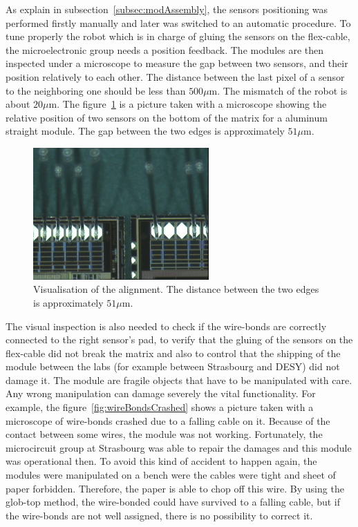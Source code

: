   As explain in subsection~\ref{subsec:modAssembly}, the sensors positioning was performed firstly manually and later was switched to an automatic procedure.
  To tune properly the robot which is in charge of gluing the sensors on the flex-cable, the microelectronic group needs a position feedback.
  The modules are then inspected under a microscope to measure the gap between two sensors, and their position relatively to each other.
  The distance between the last pixel of a sensor to the neighboring one should be less than $500 \mu\text{m}$.
  The mismatch of the robot is about $20\mu\text{m}$. 
  The figure~\ref{fig:visAlign} is a picture taken with a microscope showing the relative position of two sensors on the bottom of the matrix for a aluminum straight module.
  The gap between the two edges is approximately $51 \mu\text{m}$. 
  
  \begin{figure}
    \centering
    \includegraphics[width=0.6\textwidth]{Pictures/labTests/alignment_sensors.jpg}
    \caption{Visualisation of the alignment. The distance between the two edges is approximately $51 \mu\text{m}$.}
    \label{fig:visAlign}
  \end{figure}
  
  The visual inspection is also needed to check if the wire-bonds are correctly connected to the right sensor's pad, to verify that the gluing of the sensors on the flex-cable did not break the matrix and also to control that the shipping of the module between the labs (for example between Strasbourg and DESY) did not damage it.
  The module are fragile objects that have to be manipulated with care.
  Any wrong manipulation can damage severely the vital functionality.
  For example, the figure~\ref{fig:wireBondsCrashed} shows a picture taken with a microscope of wire-bonds crashed due to a falling cable on it.
  Because of the contact between some wires, the module was not working.
  Fortunately, the microcircuit group at Strasbourg was able to repair the damages and this module was operational then.
  To avoid this kind of accident to happen again, the modules were manipulated on a bench were the cables were tight and sheet of paper forbidden. 
  Therefore, the paper is able to chop off this wire.
  By using the glob-top method, the wire-bonded could have survived to a falling cable, but if the wire-bonds are not well assigned, there is no possibility to correct it.

